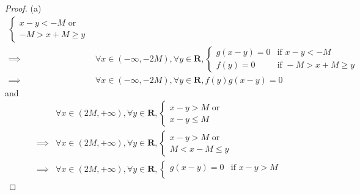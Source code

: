 \begin{proof}{(a)}
\begin{align*}
\begin{cases}
                                                                               x - y < -M \text{ or } \\
                                                                               -M > x + M \geq y
                                                                           \end{cases}                      \\
        \implies & \forall x \in (-\infty, -2M), \forall y \in \mathbf{R}, \begin{cases}
                                                                               g(x - y) = 0 & \text{if } x - y < -M        \\
                                                                               f(y) = 0     & \text{if } -M > x + M \geq y
                                                                           \end{cases} \\
        \implies & \forall x \in (-\infty, -2M), \forall y \in \mathbf{R}, f(y) g(x - y) = 0
    \end{align*}
    and
    \begin{align*}
                 & \forall x \in (2M, +\infty), \forall y \in \mathbf{R}, \begin{cases}
                                                                              x - y > M \text{ or } \\
                                                                              x - y \leq M
                                                                          \end{cases}                      \\
        \implies & \forall x \in (2M, +\infty), \forall y \in \mathbf{R}, \begin{cases}
                                                                              x - y > M \text{ or } \\
                                                                              M < x - M \leq y
                                                                          \end{cases}                      \\
        \implies & \forall x \in (2M, +\infty), \forall y \in \mathbf{R}, \begin{cases}
                                                                              g(x - y) = 0 & \text{if } x - y > M        \\

\end{cases}
\end{align*}
\end{proof}
